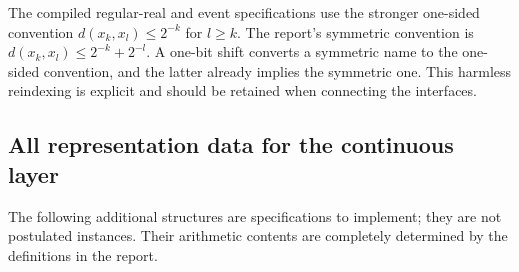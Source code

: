 The compiled regular-real and event specifications use the stronger
one-sided convention $d(x_k,x_l)\le2^{-k}$ for $l\ge k$.
The report's symmetric convention is $d(x_k,x_l)\le2^{-k}+2^{-l}$.
A one-bit shift converts a symmetric name to the one-sided convention, and
the latter already implies the symmetric one. This harmless reindexing is
explicit and should be retained when connecting the interfaces.

\subsection{All representation data for the continuous layer}

The following additional structures are specifications to implement; they
are not postulated instances. Their arithmetic contents are completely
determined by the definitions in the report.

